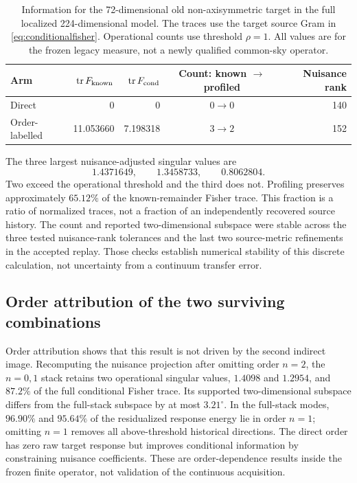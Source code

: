 \begin{table}[htbp]
\centering\small
\caption{Information for the 72-dimensional old non-axisymmetric target in the full localized 224-dimensional model. The traces use the target source Gram in \eqref{eq:conditionalfisher}. Operational counts use threshold $\rho=1$. All values are for the frozen legacy measure, not a newly qualified common-sky operator.}
\label{tab:r2}
\begin{tabular}{l r r c r}
\toprule
Arm&$\operatorname{tr} F_{\rm known}$&$\operatorname{tr} F_{\rm cond}$&Count: known $\to$ profiled&Nuisance rank\\
\midrule
Direct&0&0&$0\to0$&140\\
Order-labelled&11.053660&7.198318&$3\to2$&152\\
\bottomrule
\end{tabular}
\end{table}

The three largest nuisance-adjusted singular values are
\begin{equation}
1.4371649,\qquad 1.3458733,\qquad 0.8062804.
\label{eq:r2singular}
\end{equation}
Two exceed the operational threshold and the third does not. Profiling preserves approximately $65.12\%$ of the known-remainder Fisher trace. This fraction is a ratio of normalized traces, not a fraction of an independently recovered source history. The count and reported two-dimensional subspace were stable across the three tested nuisance-rank tolerances and the last two source-metric refinements in the accepted replay. Those checks establish numerical stability of this discrete calculation, not uncertainty from a continuum transfer error.

\subsection{Order attribution of the two surviving combinations}\label{sec:orderattr}
Order attribution shows that this result is not driven by the second indirect
image. Recomputing the nuisance projection after omitting order $n=2$, the
$n=0,1$ stack retains two operational singular values, $1.4098$ and $1.2954$,
and $87.2\%$ of the full conditional Fisher trace. Its supported
two-dimensional subspace differs from the full-stack subspace by at most
$3.21^\circ$. In the full-stack modes, $96.90\%$ and $95.64\%$ of the
residualized response energy lie in order $n=1$; omitting $n=1$ removes all
above-threshold historical directions. The direct order has zero raw target
response but improves conditional information by constraining nuisance
coefficients. These are order-dependence results inside the frozen finite
operator, not validation of the continuous acquisition.

